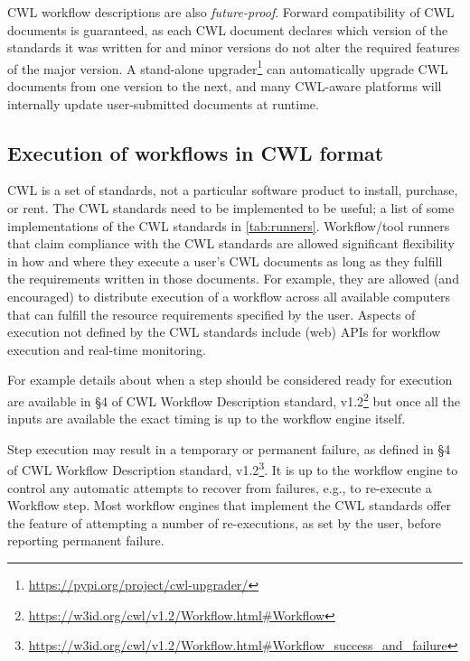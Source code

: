 \documentclass[sigconf,revew,screen,timestamp,nonacm]{acmart}
\newcommand{\addition}[1]{{\color{brown} #1}}
\newcommand{\todorone}[1]{\todo[color=orange!40]{R1.#1}}
\begin{document}
CWL workflow descriptions are also \textit{future-proof}. Forward compatibility of CWL documents is guaranteed, as each CWL document declares which version of the standards it was written for and minor versions do not alter the required features of the major version. A stand-alone upgrader\footnote{\url{https://pypi.org/project/cwl-upgrader/}} can automatically upgrade CWL documents from one version to the next, and many CWL-aware platforms will internally update user-submitted documents at runtime.


\addition{
\subsection{Execution of workflows in CWL format} \label{sec:execution}
\todorone{1}\todorone{3}CWL is a set of standards, not a particular software product to install, purchase, or rent. The CWL standards need to be implemented to be useful; a list of some implementations of the CWL standards in \ref{tab:runners}. Workflow/tool runners that claim compliance with the CWL standards are allowed significant flexibility in how and where they execute a user's CWL documents as long as they fulfill the requirements written in those documents. For example, they are allowed (and encouraged) to \todorone{6}distribute execution of a workflow across all available computers that can fulfill the resource requirements specified by the user. \todorone{5}Aspects of execution not defined by the CWL standards include (web) APIs for workflow execution and real-time monitoring.

For example details about when a step should be considered ready for execution are available in §4 of CWL Workflow Description standard, v1.2\footnote{\url{https://w3id.org/cwl/v1.2/Workflow.html\#Workflow}} but once all the inputs are available the exact timing is up to the workflow engine itself. 

\todorone{4}Step execution may result in a temporary or permanent failure, as defined in §4 of CWL Workflow Description standard, v1.2\footnote{\url{https://w3id.org/cwl/v1.2/Workflow.html\#Workflow_success_and_failure}}. It is up to the workflow engine to control any automatic attempts to recover from failures, e.g., to re-execute a Workflow step. Most workflow engines that implement the CWL standards offer the feature of attempting a number of re-executions, as set by the user, before reporting permanent failure.

}
\end{document}
